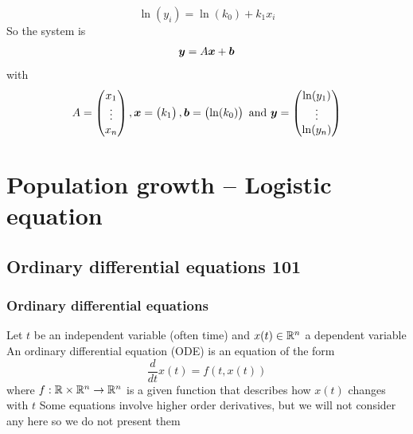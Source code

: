 \documentclass[aspectratio=169]{beamer}
\begin{document}
\begin{frame}
\[
\ln(y_i) = \ln (k_0)+k_1x_i
\]
So the system is
\begin{align*}
\bm{y} = A\bm{x}+\bm{b}
\end{align*}
with
\[
A = \begin{pmatrix}
x_1\\ \vdots \\ x_n
\end{pmatrix},
\bm{x} = \begin{pmatrix}
k_1
\end{pmatrix},
\bm{b} = \begin{pmatrix}
\ln (k_0)
\end{pmatrix}
\textrm{ and }
\bm{y} = \begin{pmatrix}
\ln (y_1)\\ \vdots\\ \ln (y_n)
\end{pmatrix}
\]
\end{frame}


\section{Population growth -- Logistic equation}


\subsection{Ordinary differential equations 101}



\begin{frame}\frametitle{Ordinary differential equations}
Let $t$ be an independent variable (often time) and $x(t)\in\mathbb{R}^n$ a dependent variable
\vfill
An ordinary differential equation (ODE) is an equation of the form
\[
\frac{d}{dt}x(t) = f(t,x(t))
\]
where $f:\mathbb{R}\times\mathbb{R}^n\to\mathbb{R}^n$ is a given function that describes how $x(t)$ changes with $t$
\vfill
Some equations involve higher order derivatives, but we will not consider any here so we do not present them
\end{frame}
\end{document}
